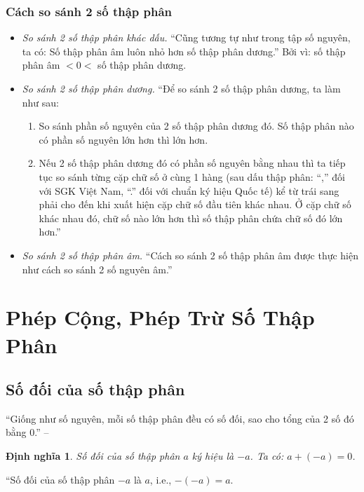 \documentclass[oneside]{book}
\numberwithin{equation}{section}
\newtheorem{dinhnghia}{Định nghĩa}[section]
\begin{document}
\subsubsection{Cách so sánh 2 số thập phân}
\begin{itemize}
	\item \textit{So sánh 2 số thập phân khác dấu.} ``Cũng tương tự như trong tập số nguyên, ta có: Số thập phân âm luôn nhỏ hơn số thập phân dương.'' Bởi vì: số thập phân âm $< 0 <$ số thập phân dương.
	\item \textit{So sánh 2 số thập phân dương.} ``Để so sánh 2 số thập phân dương, ta làm như sau:
	\begin{enumerate}
		\item So sánh phần số nguyên của 2 số thập phân dương đó. Số thập phân nào có phần số nguyên lớn hơn thì lớn hơn.
		\item Nếu 2 số thập phân dương đó có phần số nguyên bằng nhau thì ta tiếp tục so sánh từng cặp chữ số ở cùng 1 hàng (sau dấu thập phân: ``,'' đối với SGK Việt Nam, ``.'' đối với chuẩn ký hiệu Quốc tế) kể từ trái sang phải cho đến khi xuất hiện cặp chữ số đầu tiên khác nhau. Ở cặp chữ số khác nhau đó, chữ số nào lớn hơn thì số thập phân chứa chữ số đó lớn hơn.'' 
	\end{enumerate}
	\item \textit{So sánh 2 số thập phân âm.} ``Cách so sánh 2 số thập phân âm được thực hiện như cách so sánh 2 số nguyên âm.'' 
\end{itemize}


\section{Phép Cộng, Phép Trừ Số Thập Phân}

\subsection{Số đối của số thập phân}
``Giống như số nguyên, mỗi số thập phân đều có số đối, sao cho tổng của 2 số đó bằng 0.'' -- \cite[p. 48]{Thai_Anh_Dat_Ha_Loan_Nam_Quang_Toan_6_tap_2}

\begin{dinhnghia}
	\emph{Số đối} của số thập phân $a$ ký hiệu là $-a$. Ta có: $a + (-a) = 0$.
\end{dinhnghia}
``Số đối của số thập phân $-a$ là $a$, i.e., $-(-a) = a$.
\end{document}
